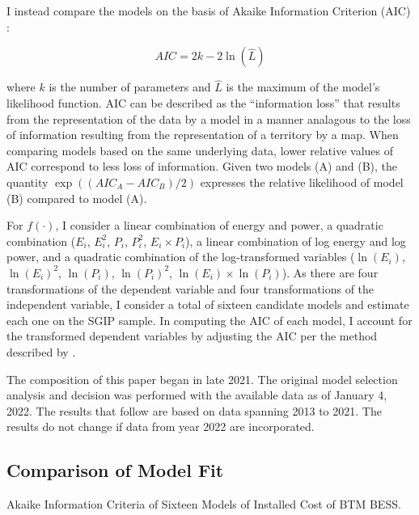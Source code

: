 I instead compare the models on the basis of Akaike Information Criterion (AIC) \citep{akaike1974}:

\begin{equation}
AIC = 2k - 2\ln(\widehat{L})
\end{equation}

where $k$ is the number of parameters and $\widehat{L}$ is the maximum of the model's likelihood function. AIC can be described as the ``information loss'' that results from the representation of the data by a model in a manner analagous to the loss of information resulting from the representation of a territory by a map. When comparing models based on the same underlying data, lower relative values of AIC correspond to less loss of information. Given two models (A) and (B), the quantity $\exp((AIC_A-AIC_B)/2)$ expresses the relative likelihood of model (B) compared to model (A).

For $f(\cdot)$, I consider a linear combination of energy and power, a quadratic combination ($E_i$, $E^2_i$, $P_i$, $P^2_i$, $E_i \times P_i$), a linear combination of log energy and log power, and a quadratic combination of the log-transformed variables ($\ln(E_i)$, $\ln(E_i)^2$, $\ln(P_i)$, $\ln(P_i)^2$, $\ln(E_i) \times \ln(P_i)$). As there are four transformations of the dependent variable and four transformations of the independent variable, I consider a total of sixteen candidate models and estimate each one on the SGIP sample. In computing the AIC of each model, I account for the transformed dependent variables by adjusting the AIC per the method described by \citet[p. 224]{akaike1978}. 

The composition of this paper began in late 2021. The original model selection analysis and decision was performed with the available data as of January 4\Xth, 2022. The results that follow are based on data spanning 2013 to 2021. The results do not change if data from year 2022 are incorporated.

\subsection{Comparison of Model Fit}\label{apdx:model_comparison}

\begin{table}[h]
\centering

\caption{Akaike Information Criteria of Sixteen Models of Installed Cost of BTM BESS.}\label{tab:SGIP_AIC} 
\end{table}

